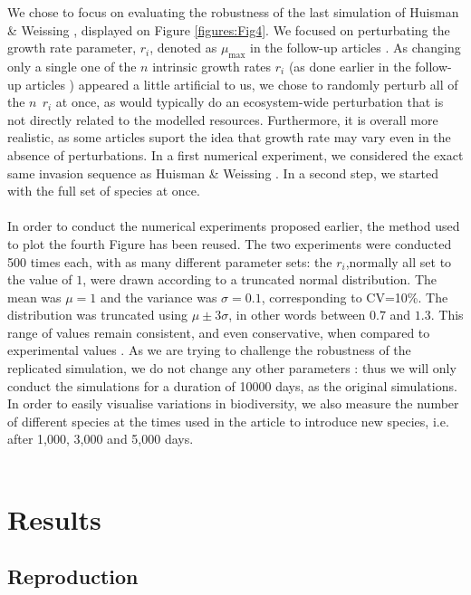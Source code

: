 We chose to focus on evaluating the robustness of the last simulation of Huisman \& Weissing \cite{1999:Huisman}, displayed on Figure \ref{figures:Fig4}. We focused on perturbating the growth rate parameter, $r_i$, denoted as $\mu_{\text{max}}$ in the follow-up articles \cite{2008:Schippers,2008:Huisman}. As changing only a single one of the $n$ intrinsic growth rates $r_i$ (as done earlier in the follow-up articles \cite{2008:Schippers,2008:Huisman}) appeared a little artificial to us, we chose to randomly perturb all of the $n~~r_i$ at once, as would typically do an ecosystem-wide perturbation that is not directly related to the modelled resources. Furthermore, it is overall more realistic, as some articles \cite{2015:Edwards} suport the idea that growth rate may vary even in the absence of perturbations.
In a first numerical experiment, we considered the exact same invasion sequence as Huisman \& Weissing \cite{1999:Huisman}. 
In a second step, we started with the full set of species at once.\\
\\
In order to conduct the numerical experiments proposed earlier, the method used to plot the fourth Figure has been reused. The two experiments were conducted 500 times each, with as many different parameter sets: the $r_i$,normally all set to the value of $1$, were drawn according to a truncated normal distribution. The mean was $\mu=1$ and the variance was $\sigma=0.1$, corresponding to CV=10\%. The distribution was truncated using $\mu\pm3\sigma$, in other words between $0.7$ and $1.3$. This range of values remain consistent, and even conservative, when compared to experimental values \cite{2015:Edwards}. As we are trying to challenge the robustness of the replicated simulation, we do not change any other parameters : thus we will only conduct the simulations for a duration of 10000 days, as the original simulations. In order to easily visualise variations in biodiversity, we also measure the number of different species at the times used in the article to introduce new species, i.e. after 1,000, 3,000 and 5,000 days.\\~\\ 

\section{Results}
\subsection{Reproduction}

